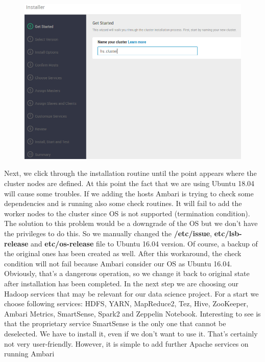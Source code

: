 \begin{figure}[H]
\hspace{-2.3cm}
\includegraphics[width=1.3\textwidth]{img/hscluster}
\label{pic:hscluster}
\end{figure}
\noindent Next, we click through the installation routine until the point appears where the cluster nodes are defined. At this point the fact that we are using Ubuntu 18.04 will cause some troubles. If we adding the hosts Ambari is trying to check some dependencies and is running also some check routines. It will fail to add the worker nodes to the cluster since OS is not supported (termination condition). The solution to this problem would be a downgrade of the OS but we don’t have the privileges to do this. So we manually
changed the \textbf{/etc/issue}, \textbf{etc/lsb-release} and \textbf{etc/os-release} file to Ubuntu 16.04 version. Of course, a backup of the original ones has been created as well. After this workaround, the check condition will not fail because Ambari consider our OS as Ubuntu 16.04. Obviously, that’s a dangerous operation, so we change it back to original state after installation has been completed.
In the next step we are choosing our Hadoop services that may be relevant for our data science project. For a start we choose following services: HDFS, YARN, MapReduce2, Tez, Hive, ZooKeeper, Ambari Metrics,
SmartSense, Spark2 and Zeppelin Notebook. Interesting to see is that the proprietary service SmartSense
is the only one that cannot be deselected. We have to install it, even if we don’t want to use it. That’s
certainly not very user-friendly. However, it is simple to add further Apache services on running Ambari
